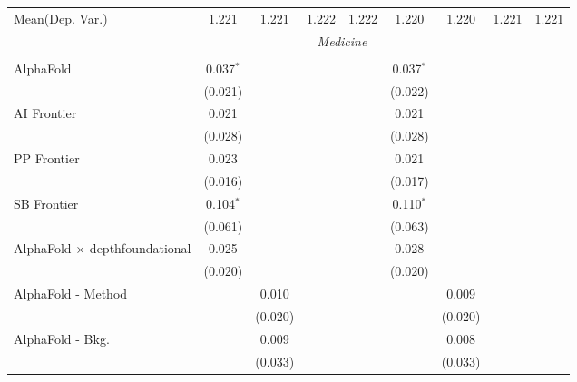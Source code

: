 \begin{tabular}{lcccccccc}
Mean(Dep. Var.) & 1.221 & 1.221 & 1.222 & 1.222 & 1.220 & 1.220 & 1.221 & 1.221 \\
 & \multicolumn{6}{c}{\textit{Medicine}} \\ \\
   AlphaFold                                      & 0.037$^{*}$ &         &       &       & 0.037$^{*}$ &         &        &   \\   
                                                  & (0.021)     &         &       &       & (0.022)     &         &        &   \\   
   AI Frontier                                    & 0.021       &         &       &       & 0.021       &         &        &   \\   
                                                  & (0.028)     &         &       &       & (0.028)     &         &        &   \\   
   PP Frontier                                    & 0.023       &         &       &       & 0.021       &         &        &   \\   
                                                  & (0.016)     &         &       &       & (0.017)     &         &        &   \\   
   SB Frontier                                    & 0.104$^{*}$ &         &       &       & 0.110$^{*}$ &         &        &   \\   
                                                  & (0.061)     &         &       &       & (0.063)     &         &        &   \\   
   AlphaFold $\times$ depthfoundational           & 0.025       &         &       &       & 0.028       &         &        &   \\   
                                                  & (0.020)     &         &       &       & (0.020)     &         &        &   \\   
   AlphaFold - Method                             &             & 0.010   &       &       &             & 0.009   &        &   \\   
                                                  &             & (0.020) &       &       &             & (0.020) &        &   \\   
   AlphaFold - Bkg.                               &             & 0.009   &       &       &             & 0.008   &        &   \\   
                                                  &             & (0.033) &       &       &             & (0.033) &        &   \\   

\end{tabular}
